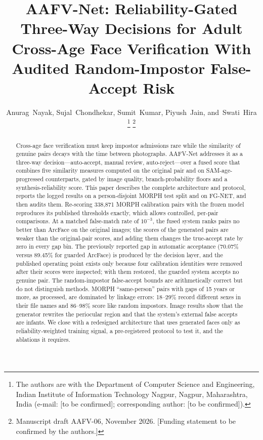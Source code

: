 \documentclass[journal]{IEEEtran}
\begin{document}
\title{AAFV-Net: Reliability-Gated Three-Way Decisions for Adult Cross-Age Face Verification With Audited Random-Impostor False-Accept Risk}

\author{Anurag~Nayak,
        Sujal~Chondhekar,
        Sumit~Kumar,
        Piyush~Jain,
        and~Swati~Hira%
\thanks{The authors are with the Department of Computer Science and Engineering, Indian Institute of Information Technology Nagpur, Nagpur, Maharashtra, India (e-mail: [to be confirmed]; corresponding author: [to be confirmed]).}%
\thanks{Manuscript draft AAFV-06, November 2026. [Funding statement to be confirmed by the authors.]}}


\maketitle

\begin{abstract}
Cross-age face verification must keep impostor admissions rare while the similarity of genuine pairs decays with the time between photographs. AAFV-Net addresses it as a three-way decision---auto-accept, manual review, auto-reject---over a fused score that combines five similarity measures computed on the original pair and on SAM-age-progressed counterparts, gated by image quality, branch-probability floors and a synthesis-reliability score. This paper describes the complete architecture and protocol, reports the logged results on a person-disjoint MORPH test split and on FG-NET, and then audits them. Re-scoring 338,871 MORPH calibration pairs with the frozen model reproduces its published thresholds exactly, which allows controlled, per-pair comparisons. At a matched false-match rate of $10^{-3}$, the fused system ranks pairs no better than ArcFace on the original images; the scores of the generated pairs are weaker than the original-pair scores, and adding them changes the true-accept rate by zero in every gap bin. The previously reported gap in automatic acceptance (70.07\% versus 89.45\% for guarded ArcFace) is produced by the decision layer, and the published operating point exists only because four calibration identities were removed after their scores were inspected; with them restored, the guarded system accepts no genuine pair. The random-impostor false-accept bounds are arithmetically correct but do not distinguish methods. MORPH ``same-person'' pairs with gaps of 15 years or more, as processed, are dominated by linkage errors: 18--29\% record different sexes in their file names and 86--98\% score like random impostors. Image results show that the generator rewrites the periocular region and that the system's external false accepts are infants. We close with a redesigned architecture that uses generated faces only as reliability-weighted training signal, a pre-registered protocol to test it, and the ablations it requires.
\end{abstract}
\end{document}
